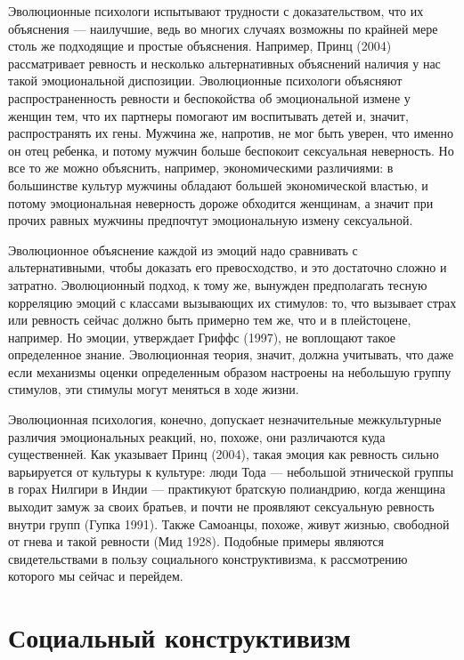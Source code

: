 \documentclass[11pt]{book}
\begin{document}
Эволюционные психологи испытывают трудности с доказательством, что их объяснения --- наилучшие, ведь во многих случаях возможны по крайней мере столь же подходящие и простые объяснения. Например, Принц (2004) рассматривает ревность и несколько альтернативных объяснений наличия у нас такой эмоциональной диспозиции. Эволюционные психологи объясняют распространенность ревности и беспокойства об эмоциональной измене у женщин тем, что их партнеры помогают им воспитывать детей и, значит, распространять их гены. Мужчина же, напротив, не мог быть уверен, что именно он отец ребенка, и потому мужчин больше беспокоит сексуальная неверность. Но все то же можно объяснить, например, экономическими различиями: в большинстве культур мужчины обладают большей экономической властью, и потому эмоциональная неверность дороже обходится женщинам, а значит при прочих равных мужчины предпочтут эмоциональную измену сексуальной.

Эволюционное объяснение каждой из эмоций надо сравнивать с альтернативными, чтобы доказать его превосходство, и это достаточно сложно и затратно. Эволюционный подход, к тому же, вынужден предполагать тесную корреляцию эмоций с классами вызывающих их стимулов: то, что вызывает страх или ревность сейчас должно быть примерно тем же, что и в плейстоцене, например. Но эмоции, утверждает Гриффс (1997), не воплощают такое определенное знание. Эволюционная теория, значит, должна учитывать, что даже если механизмы оценки определенным образом настроены на небольшую группу стимулов, эти стимулы могут меняться в ходе жизни.

Эволюционная психология, конечно, допускает незначительные межкультурные различия эмоциональных реакций, но, похоже, они различаются куда существенней. Как указывает Принц (2004), такая эмоция как ревность сильно варьируется от культуры к культуре: люди Тода --- небольшой этнической группы в горах Нилгири в Индии --- практикуют братскую полиандрию, когда женщина выходит замуж за своих братьев, и почти не проявляют сексуальную ревность внутри групп (Гупка 1991). Также Самоанцы, похоже, живут жизнью, свободной от гнева и такой ревности (Мид 1928). Подобные примеры являются свидетельствами в пользу социального конструктивизма, к рассмотрению которого мы сейчас и перейдем.

\section{Социальный конструктивизм}
\end{document}
